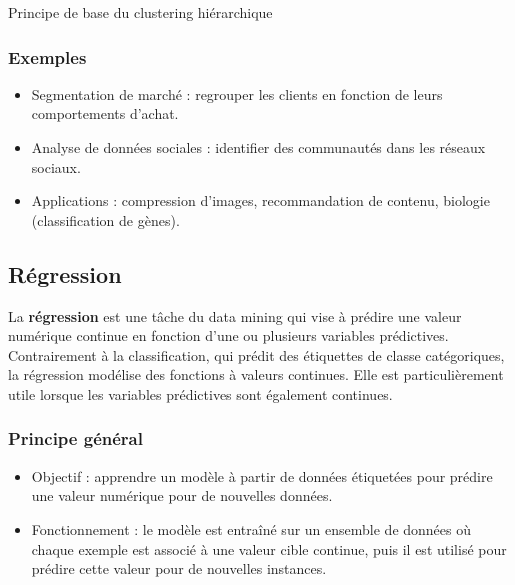 \documentclass[a4paper,12pt]{report}
\begin{document}
        Principe de base du clustering hiérarchique
        
        \subsubsection*{Exemples}

        
        \begin{itemize}
            \item  Segmentation de marché : regrouper les clients en fonction de leurs comportements d’achat.
            \item  Analyse de données sociales : identifier des communautés dans les réseaux sociaux.
            \item  Applications : compression d’images, recommandation de contenu, biologie (classification de gènes).
        \end{itemize}
        
        
      
      \subsection{Régression}

La \textbf{régression} est une tâche du data mining qui vise à prédire une valeur numérique continue en fonction d'une ou plusieurs variables prédictives. Contrairement à la classification, qui prédit des étiquettes de classe catégoriques, la régression modélise des fonctions à valeurs continues. Elle est particulièrement utile lorsque les variables prédictives sont également continues.

\subsubsection*{Principe général}

\begin{itemize}
    \item  Objectif : apprendre un modèle à partir de données étiquetées pour prédire une valeur numérique pour de nouvelles données.
    \item  Fonctionnement : le modèle est entraîné sur un ensemble de données où chaque exemple est associé à une valeur cible continue, puis il est utilisé pour prédire cette valeur pour de nouvelles instances.
\end{itemize}
\end{document}
